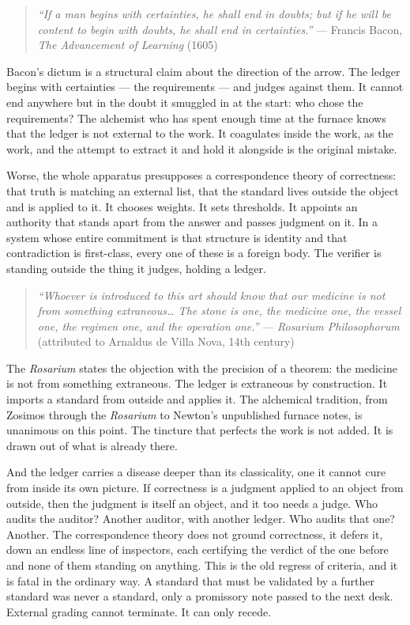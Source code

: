 \begin{quote}
\emph{``If a man begins with certainties, he shall end in doubts; but if
he will be content to begin with doubts, he shall end in certainties.''}
--- Francis Bacon, \emph{The Advancement of Learning} (1605)
\end{quote}

Bacon's dictum is a structural claim about the direction of the arrow.
The ledger begins with certainties --- the requirements --- and judges
against them. It cannot end anywhere but in the doubt it smuggled in at
the start: who chose the requirements? The alchemist who has spent
enough time at the furnace knows that the ledger is not external to the
work. It coagulates inside the work, as the work, and the attempt to
extract it and hold it alongside is the original mistake.

Worse, the whole apparatus presupposes a correspondence theory of
correctness: that truth is matching an external list, that the standard
lives outside the object and is applied to it. It chooses weights. It
sets thresholds. It appoints an authority that stands apart from the
answer and passes judgment on it. In a system whose entire commitment is
that structure is identity and that contradiction is first-class, every
one of these is a foreign body. The verifier is standing outside the
thing it judges, holding a ledger.

\begin{quote}
\emph{``Whoever is introduced to this art should know that our medicine
is not from something extraneous\ldots{} The stone is one, the medicine
one, the vessel one, the regimen one, and the operation one.''} ---
\emph{Rosarium Philosophorum} (attributed to Arnaldus de Villa Nova,
14th century)
\end{quote}

The \emph{Rosarium} states the objection with the precision of a
theorem: the medicine is not from something extraneous. The ledger is
extraneous by construction. It imports a standard from outside and
applies it. The alchemical tradition, from Zosimos through the
\emph{Rosarium} to Newton's unpublished furnace notes, is unanimous on
this point. The tincture that perfects the work is not added. It is
drawn out of what is already there.

And the ledger carries a disease deeper than its classicality, one it
cannot cure from inside its own picture. If correctness is a judgment
applied to an object from outside, then the judgment is itself an
object, and it too needs a judge. Who audits the auditor? Another
auditor, with another ledger. Who audits that one? Another. The
correspondence theory does not ground correctness, it defers it, down an
endless line of inspectors, each certifying the verdict of the one
before and none of them standing on anything. This is the old regress of
criteria, and it is fatal in the ordinary way. A standard that must be
validated by a further standard was never a standard, only a promissory
note passed to the next desk. External grading cannot terminate. It can
only recede.

